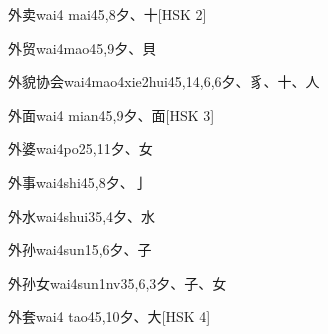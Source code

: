 \begin{EntryWithPhonetic}{外卖}{wai4 mai4}{5,8}{⼣、⼗}[HSK 2]
\end{EntryWithPhonetic}

\begin{EntryWithPhonetic}{外贸}{wai4mao4}{5,9}{⼣、⾙}
\end{EntryWithPhonetic}

\begin{EntryWithPhonetic}{外貌协会}{wai4mao4xie2hui4}{5,14,6,6}{⼣、⾘、⼗、⼈}
\end{EntryWithPhonetic}

\begin{EntryWithPhonetic}{外面}{wai4 mian4}{5,9}{⼣、⾯}[HSK 3]
\end{EntryWithPhonetic}

\begin{EntryWithPhonetic}{外婆}{wai4po2}{5,11}{⼣、⼥}
\end{EntryWithPhonetic}

\begin{EntryWithPhonetic}{外事}{wai4shi4}{5,8}{⼣、⼅}
\end{EntryWithPhonetic}

\begin{EntryWithPhonetic}{外水}{wai4shui3}{5,4}{⼣、⽔}
\end{EntryWithPhonetic}

\begin{EntryWithPhonetic}{外孙}{wai4sun1}{5,6}{⼣、⼦}
\end{EntryWithPhonetic}

\begin{EntryWithPhonetic}{外孙女}{wai4sun1nv3}{5,6,3}{⼣、⼦、⼥}
\end{EntryWithPhonetic}

\begin{EntryWithPhonetic}{外套}{wai4 tao4}{5,10}{⼣、⼤}[HSK 4]
\end{EntryWithPhonetic}

